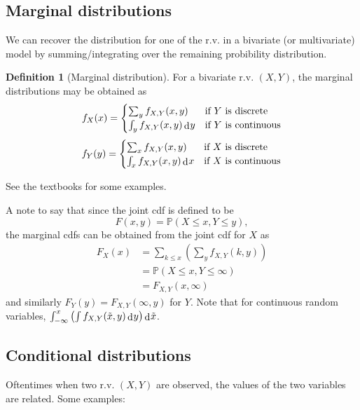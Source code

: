 \documentclass[
]{book}
\newcommand{\bbP}{\mathbb{P}}
\DeclareMathOperator{\dd}{d}
\newcommand{\dint}{\dd\hspace{0.5pt}\!}
\theoremstyle{definition}
\newtheorem{definition}{Definition}[chapter]
\theoremstyle{definition}
\theoremstyle{definition}
\theoremstyle{definition}
\theoremstyle{remark}
\begin{document}
\hypertarget{marginal-distributions}{%
\subsection{Marginal distributions}\label{marginal-distributions}}

We can recover the distribution for one of the r.v. in a bivariate (or multivariate) model by summing/integrating over the remaining probibility distribution.

\begin{definition}[Marginal distribution]
For a bivariate r.v. \((X,Y)\), the marginal distributions may be obtained as
\[
f_X(x) = 
\begin{cases}
  \sum_y f_{X,Y}(x,y) &\text{if $Y$ is discrete} \\
  \int_y f_{X,Y}(x,y) \dint y &\text{if $Y$ is continuous} \\    
\end{cases}
\]
\[
f_Y(y) = 
\begin{cases}
  \sum_x f_{X,Y}(x,y) &\text{if $X$ is discrete} \\
  \int_x f_{X,Y}(x,y) \dint x &\text{if $X$ is continuous} \\    
\end{cases}
\]
\end{definition}

See the textbooks for some examples.

A note to say that since the joint cdf is defined to be
\[
  F(x,y) = \bbP(X \leq x, Y\leq y),
\]
the marginal cdfs can be obtained from the joint cdf for \(X\) as
\begin{align*}
F_X(x) 
&= \sum_{k\leq x} \left( \sum_y f_{X,Y}(k,y) \right) \\
&= \bbP(X \leq x, Y \leq \infty) \\
&=F_{X,Y}(x,\infty)
\end{align*}
and similarly \(F_Y(y)=F_{X,Y}(\infty,y)\) for \(Y\).
Note that for continuous random variables, \(\int_{-\infty}^x \left(\int f_{X,Y}(\tilde x,y) \dint y \right) \dint \tilde x\).

\hypertarget{conditional-distributions}{%
\subsection{Conditional distributions}\label{conditional-distributions}}

Oftentimes when two r.v. \((X,Y)\) are observed, the values of the two variables are related.
Some examples:
\end{document}

